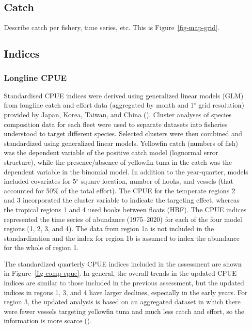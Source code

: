 \documentclass[
]{scrartcl}
\begin{document}
\subsection{Catch}\label{catch}

Describe catch per fishery, time series, etc. This is
Figure~\ref{fig-map-grid}.

\subsection{Indices}\label{indices}

\subsubsection{Longline CPUE}\label{longline-cpue}

Standardised CPUE indices were derived using generalized linear models
(GLM) from longline catch and effort data (aggregated by month and
1\(^\circ\) grid resolution) provided by Japan, Korea, Taiwan, and China
().
Cluster analyses of species composition data for each fleet were used to
separate datasets into fisheries understood to target different species.
Selected clusters were then combined and standardized using generalized
linear models. Yellowfin catch (numbers of fish) was the dependent
variable of the positive catch model (lognormal error structure), while
the presence/absence of yellowfin tuna in the catch was the dependent
variable in the binomial model. In addition to the year-quarter, models
included covariates for 5\(^\circ\) square location, number of hooks,
and vessels (that accounted for 50\% of the total effort). The CPUE for
the temperate regions 2 and 3 incorporated the cluster variable to
indicate the targeting effect, whereas the tropical regions 1 and 4 used
hooks between floats (HBF). The CPUE indices represented the time series
of abundance (1975--2020) for each of the four model regions (1, 2, 3,
and 4). The data from region 1a is not included in the standardization
and the index for region 1b is assumed to index the abundance for the
whole of region 1.

The standardized quarterly CPUE indices included in the assessment are
shown in Figure~\ref{fig-comp-cpue}. In general, the overall trends in
the updated CPUE indices are similar to those included in the previous
assessment, but the updated indices in regons 1, 3, and 4 have larger
declines, especially in the early years. For region 3, the updated
analysis is based on an aggregated dataset in which there were fewer
vessels targeting yellowfin tuna and much less catch and effort, so the
information is more scarce
().
\end{document}

